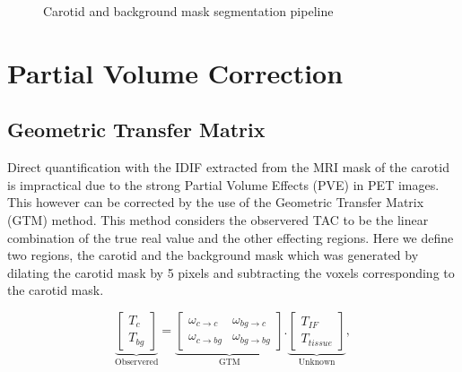 \begin{figure}
	\centering
	\caption{Carotid and background mask segmentation pipeline}
\end{figure}

\section{Partial Volume Correction}
\subsection{Geometric Transfer Matrix}
Direct quantification with the IDIF extracted from the MRI mask of the carotid is impractical due to the strong Partial Volume Effects (PVE) in PET images. %
This however can be corrected by the use of the Geometric Transfer Matrix (GTM) method. This method considers the observered TAC to be the linear combination of the true real value and the other effecting regions.
Here we define two regions, the carotid and the background mask which was generated by dilating the carotid mask by 5 pixels and subtracting the voxels corresponding to the carotid mask.

\begin{equation}
	\underbrace{
		\begin{bmatrix}
			T_{c} \\
			T_{bg}
		\end{bmatrix}
	}_{\text{Observered}}
	=
	\underbrace{
		\begin{bmatrix}
			\omega_{c \rightarrow c}  & \omega_{bg \rightarrow c}  \\
			\omega_{c \rightarrow bg} & \omega_{bg \rightarrow bg}
		\end{bmatrix}
	}_{\text{GTM}}
	.
	\underbrace{
		\begin{bmatrix}
			T_{IF} \\
			T_{tissue}
		\end{bmatrix}
	}_{\text{Unknown}},
\end{equation}

